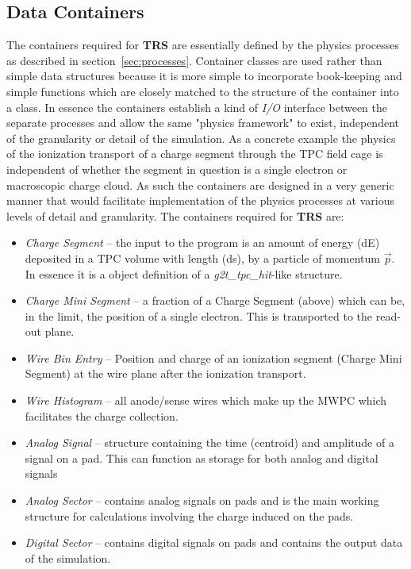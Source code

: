 \documentclass{article}
\begin{document}
\subsection{Data Containers}
\label{sec:dataContainers}

The containers required for {\bf TRS} are essentially defined by 
the physics processes as described in section~\ref{sec:processes}.  Container
classes are used rather than simple data structures because it is
more simple to incorporate book-keeping and simple functions which
are closely matched to the structure of the container into a class.  
In essence the
containers establish a kind of {\em I/O} interface between the separate
processes and allow the same "physics framework" to exist, independent of
the granularity or detail of the simulation.  As a concrete example the
physics of the ionization transport of a charge segment through the
TPC field cage is independent of whether the segment in question is
a single electron or macroscopic charge cloud.  As such the containers
are designed in a very generic manner that would facilitate implementation
of the physics processes at various levels of detail and granularity.
The containers required for {\bf TRS} are:

\begin{itemize}
   \item {\em Charge Segment} -- the input to the program is an amount of
     energy (dE) deposited in a TPC volume with length (ds), by a
     particle of momentum $\vec{p}$.  In essence it is a object definition
     of a {\em g2t\_tpc\_hit}-like structure.
   \item {\em Charge Mini Segment} -- a fraction of a Charge Segment (above) 
     which can be, in the limit, the position of a single electron.
     This is transported to the read-out plane.
   \item {\em Wire Bin Entry} -- Position and charge of an ionization segment 
     (Charge Mini Segment)
     at the wire plane after the ionization transport.
   \item {\em Wire Histogram} -- all anode/sense wires which make
     up the MWPC which facilitates the charge collection.
   \item {\em Analog Signal} -- structure containing the time (centroid) and 
     amplitude of a signal on a pad.  This can function as storage 
     for both analog and digital signals
   \item {\em Analog Sector} -- contains analog signals on pads and is the
     main working structure for calculations involving the charge induced
     on the pads.
   \item {\em Digital Sector} -- contains digital signals on pads and contains the
     output data of the simulation.     
\end{itemize}
\end{document}
